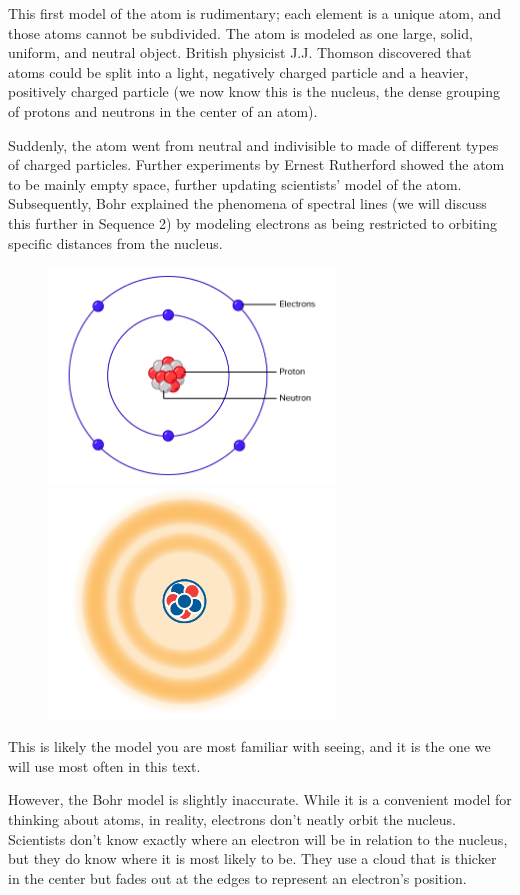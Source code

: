 This first model of the atom is rudimentary; each element is a unique atom,
and those atoms cannot be subdivided. The atom is modeled as one large, solid, 
uniform, and neutral object. British physicist J.J. Thomson discovered that 
atoms could be split into a light, negatively charged particle and a heavier, 
positively charged particle (we now know this is the nucleus, the dense 
grouping of protons and neutrons in the center of an atom). 

Suddenly, the atom went from neutral and indivisible to made of different types
of charged particles. Further experiments by Ernest Rutherford showed the atom 
to be mainly empty space, further updating scientists' model of the atom. 
Subsequently, Bohr explained the phenomena of spectral lines (we will discuss 
this further in Sequence 2) by modeling electrons as being restricted to 
orbiting specific distances from the nucleus. 

\begin{figure}
\noindent\includegraphics[width = 3in]{bohr_model.png}
\noindent\includegraphics[width=3in]{atomCloud.png}
\end{figure}

This is likely the model you are most familiar with seeing, and it is the one we
will use most often in this text. 

However, the Bohr model is slightly inaccurate. While it is a convenient model for
thinking about atoms, in reality, electrons don't neatly orbit the nucleus.
Scientists don't know exactly where an electron will be in relation to the
nucleus, but they do know where it is most likely to be. They use a cloud that is
thicker in the center but fades out at the edges to represent an electron's
position.

